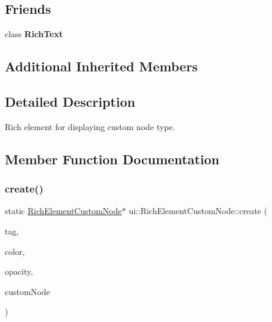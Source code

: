 \subsection*{Friends}
\begin{DoxyCompactItemize}
\item 
\mbox{\label{classui_1_1RichElementCustomNode_a0e450ad30cc76fbbd86270e035cc8790}} 
class {\bfseries Rich\+Text}
\end{DoxyCompactItemize}
\subsection*{Additional Inherited Members}


\subsection{Detailed Description}
Rich element for displaying custom node type. 

\subsection{Member Function Documentation}
\mbox{\label{classui_1_1RichElementCustomNode_a3788585f7191542cfcb534211bfe310e}} 
\subsubsection{\texorpdfstring{create()}{create()}\hspace{0.1cm}{\footnotesize\ttfamily [1/2]}}
{\footnotesize\ttfamily static \hyperlink{classui_1_1RichElementCustomNode}{Rich\+Element\+Custom\+Node}$\ast$ ui\+::\+Rich\+Element\+Custom\+Node\+::create (\begin{DoxyParamCaption}\item[{int}]{tag,  }\item[{const \hyperlink{structColor3B}{Color3B} \&}]{color,  }\item[{G\+Lubyte}]{opacity,  }\item[{\hyperlink{classNode}{Node} $\ast$}]{custom\+Node }\end{DoxyParamCaption})\hspace{0.3cm}{\ttfamily [static]}}



